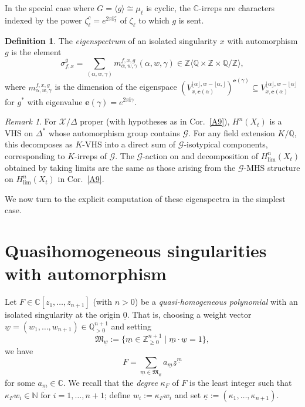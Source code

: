 \documentclass[12pt,letterpaper,english]{amsart}
\numberwithin{equation}{section}
\numberwithin{figure}{section}
\theoremstyle{plain}
\theoremstyle{remark}
\newtheorem{rem}[equation]{Remark}
\theoremstyle{definition}
\newtheorem{defn}[equation]{Definition}
\theoremstyle{definition}
\theoremstyle{plain}
\theoremstyle{plain}
\theoremstyle{plain}
\theoremstyle{plain}
\theoremstyle{definition}
\def\uo{\underline{0}}
\def\uk{\underline{\kappa}}
\def\um{\underline{m}}
\def\ay{\mathbb{i}}
\def\QQ{\mathbb{Q}}
\def\CC{\mathbb{C}}
\def\ZZ{\mathbb{Z}}
\def\uz{\underline{z}}
\def\X{\mathcal{X}}
\def\NN{\mathbb{N}}
\def\ay{\mathbf{i}}
\def\be{\mathbf{e}}
\def\uw{\underline{w}}
\theoremstyle{definition}
\begin{document}
In the special case where $G=\langle g\rangle\cong \mu_{\ell}$ is cyclic, the $\CC$-irreps are characters indexed by the power $\zeta_{\ell}^c=e^{2\pi\ay\frac{c}{\ell}}$ of $\zeta_{\ell}$ to which $g$ is sent.

\begin{defn}\label{A12}
The \emph{eigenspectrum} of an isolated singularity $x$ with automorphism $g$ is the element $$\sigma^g_{f,x}=\sum_{(\alpha,w,\gamma)}m^{f,x,g}_{\alpha,w,\gamma}(\alpha,w,\gamma)\in \ZZ\langle \QQ\times\ZZ\times\QQ/\ZZ\rangle,$$ where $m^{f,x,g}_{\alpha,w,\gamma}$ is the dimension of the eigenspace $(V^{\lfloor\alpha\rfloor,w-\lfloor\alpha,\rfloor}_{x,\be(\alpha)})^{\be(\gamma)}\subseteq V_{x,\be(\alpha)}^{\lfloor\alpha\rfloor,w-\lfloor\alpha\rfloor}$ for $g^*$ with eigenvalue $\be(\gamma)=e^{2\pi\ay\gamma}$.
\end{defn}

\begin{rem}\label{A13}
For $\X/\Delta$ proper (with hypotheses as in Cor.~\ref{A9}), $H^n(X_t)$ is a VHS on $\Delta^*$ whose automorphism group contains $\mathcal{G}$. For any field extension $K/\QQ$, this decomposes as $K$-VHS into a direct sum of $\mathcal{G}$-isotypical components, corresponding to $K$-irreps of $\mathcal{G}$.  The $\mathcal{G}$-action on and decomposition of $H^n_{\lim}(X_t)$ obtained by taking limits are the same as those arising from the $\mathcal{G}$-MHS structure on $H^n_{\lim}(X_t)$ in Cor.~\ref{A9}.
\end{rem}

We now turn to the explicit computation of these eigenspectra in the simplest case.



\section{Quasihomogeneous singularities with automorphism}\label{S2}

Let $F\in \CC[z_1,\ldots,z_{n+1}]$ (with $n>0$) be a \emph{quasi-homogeneous polynomial} with an isolated singularity at the origin $\uo$.  That is, choosing a weight vector $\uw=(w_1,\ldots,w_{n+1})\in \QQ_{>0}^{n+1}$ and setting $$\mathfrak{M}_{\uw}:=\{\um\in \ZZ_{\geq 0}^{n+1}\mid \um\cdot \uw=1\},$$ we have 
\begin{equation}\label{B1}
F=\sum_{\um\in \mathfrak{M}_{\uw}}a_{\um}\uz^{\um}
\end{equation}
for some $a_{\um}\in \CC$.  We recall that the \emph{degree} $\kappa_F$ of $F$ is the least integer such that $\kappa_F w_i\in \NN$ for $i=1,\ldots,n+1$; define $w_i:=\kappa_F w_i$ and set $\uk:=(\kappa_1,\ldots,\kappa_{n+1})$.
\end{document}
